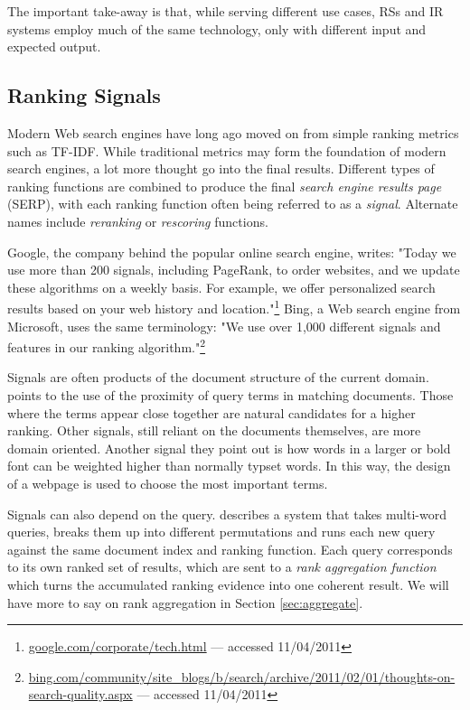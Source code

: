 The important take-away is that, while serving different use cases, RSs and IR systems 
employ much of the same technology, only with different input and expected output.


\subsection{Ranking Signals}
\label{subsec:signals}

Modern Web search engines have long ago moved on from simple ranking metrics such as TF-IDF.
While traditional metrics may form the foundation of modern search engines, a lot more thought go into the final results.
Different types of ranking functions are combined to produce the final \emph{search engine results page} (SERP),
with each ranking function often being referred to as a \emph{signal}. Alternate names include
\emph{reranking} or \emph{rescoring} functions.

Google, the company behind the popular online search engine, writes: "Today we use more than 200 signals, including PageRank, 
to order websites, and we update these algorithms on a weekly basis. 
For example, we offer personalized search results based on your web history and 
location."\footnote{\url{google.com/corporate/tech.html} --- accessed 11/04/2011}
Bing, a Web search engine from Microsoft, uses the same terminology:
"We use over 1,000 different signals and features in our ranking 
algorithm."\footnote{\url{bing.com/community/site_blogs/b/search/archive/2011/02/01/thoughts-on-search-quality.aspx} --- accessed 11/04/2011}

Signals are often products of the document structure of the current domain.
\citet[p5]{Bender2005} points to the use of the proximity of query terms in matching documents.
Those where the terms appear close together are natural candidates for a higher ranking.
Other signals, still reliant on the documents themselves, are more domain oriented.
Another signal they point out is how words in a larger or bold font can be weighted 
higher than normally typset words.
In this way, the design of a webpage is used to choose the most important terms. 

Signals can also depend on the query. \citet[p145]{Manning2008} describes a system that takes
multi-word queries, breaks them up into different permutations and runs each new query against the same
document index and ranking function. Each query corresponds to its own ranked set of results,
which are sent to a \emph{rank aggregation function} which turns the accumulated ranking evidence
into one coherent result. We will have more to say on rank aggregation in Section \ref{sec:aggregate}.  

